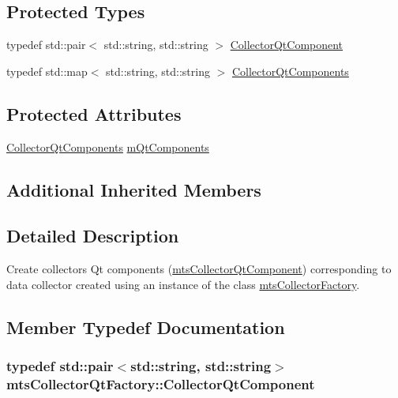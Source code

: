 \subsection*{Protected Types}
\begin{DoxyCompactItemize}
\item 
typedef std\+::pair$<$ std\+::string, std\+::string $>$ \hyperlink{classmts_collector_qt_factory_a8860ea4a5149d8f748ad9e3e32d6b271}{Collector\+Qt\+Component}
\item 
typedef std\+::map$<$ std\+::string, std\+::string $>$ \hyperlink{classmts_collector_qt_factory_a328adc18f15a7e2e39af3d30ba436c04}{Collector\+Qt\+Components}
\end{DoxyCompactItemize}
\subsection*{Protected Attributes}
\begin{DoxyCompactItemize}
\item 
\hyperlink{classmts_collector_qt_factory_a328adc18f15a7e2e39af3d30ba436c04}{Collector\+Qt\+Components} \hyperlink{classmts_collector_qt_factory_a09d17a7a0f8afab2ec0171abbf57f931}{m\+Qt\+Components}
\end{DoxyCompactItemize}
\subsection*{Additional Inherited Members}


\subsection{Detailed Description}
Create collectors Qt components (\hyperlink{classmts_collector_qt_component}{mts\+Collector\+Qt\+Component}) corresponding to data collector created using an instance of the class \hyperlink{classmts_collector_factory}{mts\+Collector\+Factory}. 

\subsection{Member Typedef Documentation}
\hypertarget{classmts_collector_qt_factory_a8860ea4a5149d8f748ad9e3e32d6b271}{}
\subsubsection[{Collector\+Qt\+Component}]{\setlength{\rightskip}{0pt plus 5cm}typedef std\+::pair$<$std\+::string, std\+::string$>$ {\bf mts\+Collector\+Qt\+Factory\+::\+Collector\+Qt\+Component}\hspace{0.3cm}{\ttfamily [protected]}}\label{classmts_collector_qt_factory_a8860ea4a5149d8f748ad9e3e32d6b271}
\hypertarget{classmts_collector_qt_factory_a328adc18f15a7e2e39af3d30ba436c04}{}
